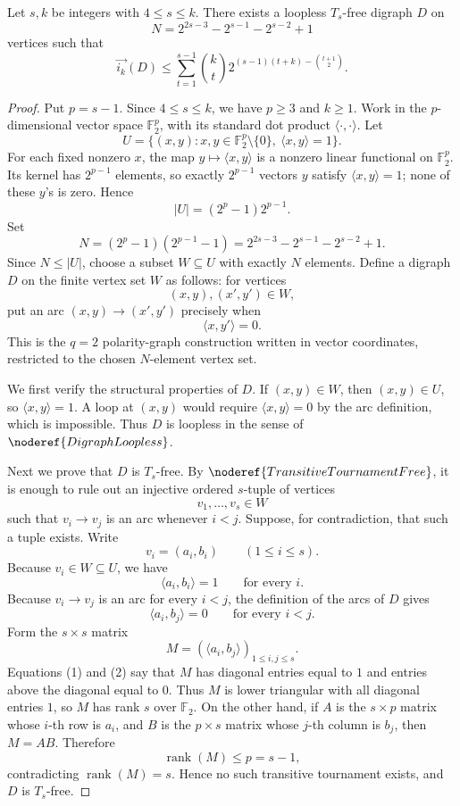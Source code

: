 \begin{lemma}
Let \(s,k\) be integers with \(4\le s\le k\). There exists a loopless \(T_s\)-free digraph \(D\) on
\[
  N=2^{2s-3}-2^{s-1}-2^{s-2}+1
\]
vertices such that
\[
  \overrightarrow{i_k}(D)\le
  \sum_{t=1}^{s-1}\binom{k}{t}2^{(s-1)(t+k)-\binom{t+1}{2}}.
\]
\end{lemma}
\begin{proof}
Put \(p=s-1\). Since \(4\le s\le k\), we have \(p\ge3\) and \(k\ge1\). Work in the \(p\)-dimensional vector space \(\mathbb F_2^p\), with its standard dot product \(\langle\cdot,\cdot\rangle\). Let
\[
  U=\{(x,y):x,y\in\mathbb F_2^p\setminus\{0\},\ \langle x,y\rangle=1\}.
\]
For each fixed nonzero \(x\), the map \(y\mapsto\langle x,y\rangle\) is a nonzero linear functional on \(\mathbb F_2^p\). Its kernel has \(2^{p-1}\) elements, so exactly \(2^{p-1}\) vectors \(y\) satisfy \(\langle x,y\rangle=1\); none of these \(y\)'s is zero. Hence
\[
  |U|=(2^p-1)2^{p-1}.
\]
Set
\[
  N=(2^p-1)(2^{p-1}-1)
    =2^{2s-3}-2^{s-1}-2^{s-2}+1.
\]
Since \(N\le |U|\), choose a subset \(W\subseteq U\) with exactly \(N\) elements. Define a digraph \(D\) on the finite vertex set \(W\) as follows: for vertices
\[
  (x,y),(x',y')\in W,
\]
put an arc \((x,y)\to(x',y')\) precisely when
\[
  \langle x,y'\rangle=0.
\]
This is the \(q=2\) polarity-graph construction written in vector coordinates, restricted to the chosen \(N\)-element vertex set.

We first verify the structural properties of \(D\). If \((x,y)\in W\), then \((x,y)\in U\), so \(\langle x,y\rangle=1\). A loop at \((x,y)\) would require \(\langle x,y\rangle=0\) by the arc definition, which is impossible. Thus \(D\) is loopless in the sense of \(\noderef{DigraphLoopless}\).

Next we prove that \(D\) is \(T_s\)-free. By \(\noderef{TransitiveTournamentFree}\), it is enough to rule out an injective ordered \(s\)-tuple of vertices
\[
  v_1,\ldots,v_s\in W
\]
such that \(v_i\to v_j\) is an arc whenever \(i<j\). Suppose, for contradiction, that such a tuple exists. Write
\[
  v_i=(a_i,b_i)\qquad(1\le i\le s).
\]
Because \(v_i\in W\subseteq U\), we have
\[
  \langle a_i,b_i\rangle=1 \qquad\text{for every } i. \tag{1}
\]
Because \(v_i\to v_j\) is an arc for every \(i<j\), the definition of the arcs of \(D\) gives
\[
  \langle a_i,b_j\rangle=0 \qquad\text{for every } i<j. \tag{2}
\]
Form the \(s\times s\) matrix
\[
  M=(\langle a_i,b_j\rangle)_{1\le i,j\le s}.
\]
Equations (1) and (2) say that \(M\) has diagonal entries equal to \(1\) and entries above the diagonal equal to \(0\). Thus \(M\) is lower triangular with all diagonal entries \(1\), so \(M\) has rank \(s\) over \(\mathbb F_2\). On the other hand, if \(A\) is the \(s\times p\) matrix whose \(i\)-th row is \(a_i\), and \(B\) is the \(p\times s\) matrix whose \(j\)-th column is \(b_j\), then \(M=AB\). Therefore
\[
  \operatorname{rank}(M)\le p=s-1,
\]
contradicting \(\operatorname{rank}(M)=s\). Hence no such transitive tournament exists, and \(D\) is \(T_s\)-free.


\end{proof}
